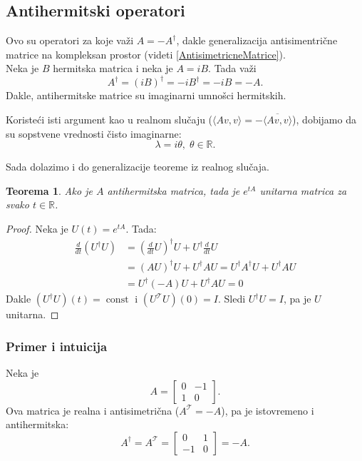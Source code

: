 \documentclass[a4paper,12pt,twoside]{report}
\newtheorem{theorem}{Teorema}[section]
\numberwithin{algorithm}{section}
\begin{document}
\subsection{Antihermitski operatori}
\label{AntihermitskiOperatori}
Ovo su operatori za koje važi $A = -A^\dagger$, dakle generalizacija antisimentrične matrice na kompleksan prostor (videti \ref{AntisimetricneMatrice}).\\

Neka je $B$ hermitska matrica i neka je $A = iB$. Tada važi
\[A^\dagger = (iB)^\dagger = -iB^\dagger = -iB = -A.\]
Dakle, antihermitske matrice su imaginarni umnošci hermitskih.
\medskip

Koristeći isti argument kao u realnom slučaju ($\langle Av, v \rangle = -\overline{\langle Av, v \rangle}$), dobijamo da su 
sopstvene vrednosti čisto imaginarne:
\[ \lambda = i \theta, \; \theta \in \mathbb{R}. \]

Sada dolazimo i do generalizacije teoreme iz realnog slučaja.
\begin{theorem}
    Ako je $A$ antihermitska matrica, tada je $e^{tA}$ unitarna matrica za svako $t \in \mathbb{R}$.
\end{theorem}
\begin{proof}
    Neka je $U(t) = e^{tA}$. Tada:
    \[ \begin{aligned}
        \frac{d}{dt} (U^\dagger U) &= \left(\frac{d}{dt}U\right)^\dagger U + U^\dagger \frac{d}{dt}U\\[6pt]
        &= (AU)^\dagger U + U^\dagger AU = U^\dagger A^\dagger U + U^\dagger AU\\[6pt]
        &= U^\dagger(-A)U + U^\dagger A U = 0
    \end{aligned}\]
    Dakle $(U^\dagger U)(t) = \operatorname{const}$ i $(U^\mathcal{T}U)(0) = I$. Sledi $U^\dagger U = I$, pa je $U$ unitarna.
\end{proof}

\subsubsection{Primer i intuicija}

Neka je
\[
A = \begin{bmatrix} 0 & -1 \\ 1 & 0 \end{bmatrix}.
\]
Ova matrica je realna i antisimetrična ($A^\mathcal{T} = -A$), pa je istovremeno i antihermitska:
\[
A^\dagger = A^\mathcal{T} = \begin{bmatrix} 0 & 1 \\ -1 & 0 \end{bmatrix} = -A.
\]
\end{document}
